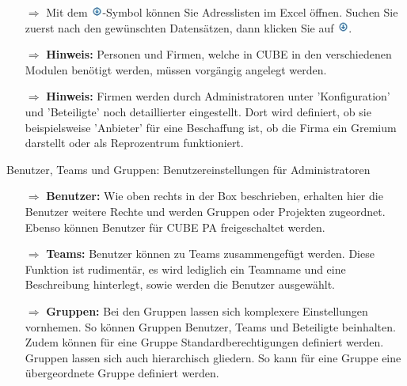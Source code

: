 \documentclass{article}
\begin{document}
\begin{multicols}{2}
\begin{tcolorbox}[colback=blue!5,colframe=blue!40!black,title=Weitere Funktionen in der Adressliste und Hinweise]
\begin{itemize}
  \item[$\Longrightarrow$] Mit dem \includegraphics[height=10pt]{Icons/ListeGenerieren.jpg}-Symbol können Sie Adresslisten im Excel öffnen. Suchen Sie zuerst nach den gewünschten Datensätzen, dann klicken Sie auf \includegraphics[height=10pt]{Icons/ListeGenerieren.jpg}.
  \item[$\Longrightarrow$] \textbf{Hinweis:} Personen und Firmen, welche in CUBE in den verschiedenen Modulen benötigt werden, müssen vorgängig angelegt werden.
  \item[$\Longrightarrow$] \textbf{Hinweis:} Firmen werden durch Administratoren unter 'Konfiguration' und 'Beteiligte' noch detaillierter eingestellt. Dort wird definiert, ob sie beispielsweise 'Anbieter' für eine Beschaffung ist, ob die Firma ein Gremium darstellt oder als Reprozentrum funktioniert.
\end{itemize}
\end{tcolorbox}


\end{multicols}

\vspace{\baselineskip}


\begin{beamerlikethm}{Benutzer{,} Teams und Gruppen: Benutzereinstellungen für Administratoren}
\begin{itemize}
  \item[$\Longrightarrow$] \textbf{Benutzer:} Wie oben rechts in der Box beschrieben, erhalten hier die Benutzer weitere Rechte und werden Gruppen oder Projekten zugeordnet. Ebenso können Benutzer für CUBE PA freigeschaltet werden.
 \item[$\Longrightarrow$] \textbf{Teams:} Benutzer können zu Teams zusammengefügt werden. Diese Funktion ist rudimentär, es wird lediglich ein Teamname und eine Beschreibung hinterlegt, sowie werden die Benutzer ausgewählt. 
 \item[$\Longrightarrow$] \textbf{Gruppen:} Bei den Gruppen lassen sich komplexere Einstellungen vornhemen. So können Gruppen Benutzer, Teams und Beteiligte beinhalten. Zudem können für eine Gruppe Standardberechtigungen definiert werden. Gruppen lassen sich auch hierarchisch gliedern. So kann für eine Gruppe eine übergeordnete Gruppe definiert werden.
\end{itemize}
\end{beamerlikethm}
\end{document}
